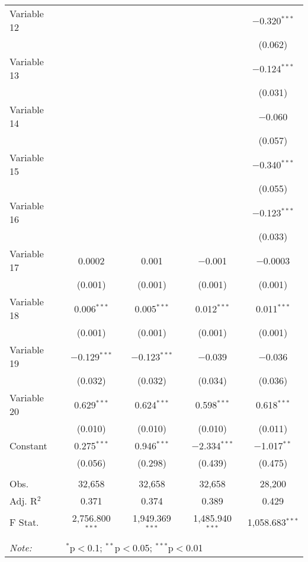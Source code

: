 \begin{table*}[htp!]
\begin{tabular}{@{\extracolsep{5pt}}lcccc}
  Variable 12 &  &  &  & $-$0.320$^{***}$ \\ 
  &  &  &  & (0.062) \\ 
  Variable 13 &  &  &  & $-$0.124$^{***}$ \\ 
  &  &  &  & (0.031) \\ 
  Variable 14 &  &  &  & $-$0.060 \\ 
  &  &  &  & (0.057) \\ 
  Variable 15 &  &  &  & $-$0.340$^{***}$ \\ 
  &  &  &  & (0.055) \\ 
  Variable 16 &  &  &  & $-$0.123$^{***}$ \\ 
  &  &  &  & (0.033) \\ 
  Variable 17 & 0.0002 & 0.001 & $-$0.001 & $-$0.0003 \\ 
  & (0.001) & (0.001) & (0.001) & (0.001) \\
  Variable 18 & 0.006$^{***}$ & 0.005$^{***}$ & 0.012$^{***}$ & 0.011$^{***}$ \\ 
  & (0.001) & (0.001) & (0.001) & (0.001) \\ 
  Variable 19 & $-$0.129$^{***}$ & $-$0.123$^{***}$ & $-$0.039 & $-$0.036 \\ 
  & (0.032) & (0.032) & (0.034) & (0.036) \\ 
  Variable 20 & 0.629$^{***}$ & 0.624$^{***}$ & 0.598$^{***}$ & 0.618$^{***}$ \\ 
  & (0.010) & (0.010) & (0.010) & (0.011) \\ 
  Constant & 0.275$^{***}$ & 0.946$^{***}$ & $-$2.334$^{***}$ & $-$1.017$^{**}$ \\ 
  & (0.056) & (0.298) & (0.439) & (0.475) \\ 

\hline \\[-1.8ex] 
Obs. & 32,658 & 32,658 & 32,658 & 28,200 \\ 
Adj. R$^{2}$ & 0.371 & 0.374 & 0.389 & 0.429 \\ 
F Stat. & 2,756.800$^{***}$  & 1,949.369$^{***}$  & 1,485.940$^{***}$  & 1,058.683$^{***}$  \\ 
\hline \\[-1.8ex] 
\textsl{Note:}  & \multicolumn{4}{l}{$^{*}$p$<$0.1; $^{**}$p$<$0.05; $^{***}$p$<$0.01} \\ 
\end{tabular} 
\end{table*}  